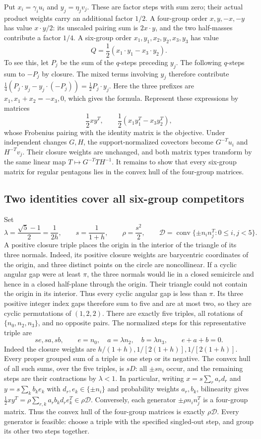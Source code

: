 Put $x_i=\gamma_i u_i$ and $y_j=\eta_j v_j$. These are factor steps with
sum zero; their actual product weights carry an additional factor $1/2$.
A four-group order $x,y,-x,-y$ has value $x\cdot y/2$: its unscaled
pairing sum is $2x\cdot y$, and the two half-masses contribute a factor
$1/4$. A six-group order
$x_1,y_1,x_2,y_2,x_3,y_3$ has value
\[
 Q=\frac12(x_1\cdot y_1-x_3\cdot y_2).
\]
To see this, let $P_j$ be the sum of the $q$-steps preceding $y_j$.
The following $q$-steps sum to $-P_j$ by closure. The mixed terms involving
$y_j$ therefore contribute
$\tfrac14(P_j\cdot y_j-y_j\cdot(-P_j))=\tfrac12P_j\cdot y_j$.
Here the three prefixes are $x_1,x_1+x_2=-x_3,0$, which gives the formula.
Represent these expressions by matrices
\[
 \frac12xy^T,\qquad \frac12(x_1y_1^T-x_3y_2^T),
\]
whose Frobenius pairing with the identity matrix is the objective. Under
independent changes $G,H$, the support-normalized covectors become
$G^{-T}u_i$ and $H^{-T}v_j$. Their closure weights are unchanged, and both
matrix types transform by the same linear map
$T\mapsto G^{-T}TH^{-1}$. It remains to show that every six-group matrix for
regular pentagons lies in the convex hull of the four-group matrices.

\subsection{Two identities cover all six-group competitors}
Set
\[
 \lambda=\frac{\sqrt5-1}{2}=\frac1{2h},\qquad
 s=\frac1{1+h},\qquad \rho=\frac{s^2}{2},\qquad
 \mathcal D=\operatorname{conv}\{\pm n_i n_j^T:0\le i,j<5\}.
\]
A positive closure triple places the origin in the interior of the triangle
of its three normals. Indeed, its positive closure weights are barycentric
coordinates of the origin, and three distinct points on the circle are
noncollinear. If a cyclic angular gap were at least $\pi$, the three
normals would lie in a closed semicircle and hence in a closed half-plane
through the origin. Their triangle could not contain the origin in its
interior. Thus every cyclic angular gap is less than $\pi$.
Its three positive integer index gaps therefore sum to five and are at most
two, so they are cyclic permutations of $(1,2,2)$. There are exactly five
triples, all rotations of $\{n_0,n_2,n_3\}$, and no opposite pairs.
The normalized steps for this representative triple are
\[
 se,sa,sb,\qquad e=n_0,\quad a=\lambda n_2,\quad
 b=\lambda n_3,\qquad e+a+b=0.
\]
Indeed the closure weights are $h/(1+h),1/[2(1+h)],1/[2(1+h)]$.
Every proper grouped sum of a triple is one step or its negative. The convex
hull of all such sums, over the five triples, is $sD$: all $\pm sn_i$ occur,
and the remaining steps are their contractions by $\lambda<1$.
In particular, writing $x=s\sum_r a_r d_r$ and
$y=s\sum_k b_k e_k$ with $d_r,e_k\in\{\pm n_i\}$ and probability
weights $a_r,b_k$, bilinearity gives
$\tfrac12xy^T=\rho\sum_{r,k}a_rb_kd_re_k^T\in\rho\mathcal D$.
Conversely, each generator $\pm\rho n_i n_j^T$ is a four-group matrix.
Thus the convex hull of the four-group matrices is exactly $\rho\mathcal D$.
Every generator is feasible: choose a triple with the specified singled-out
step, and group its other two steps together.

